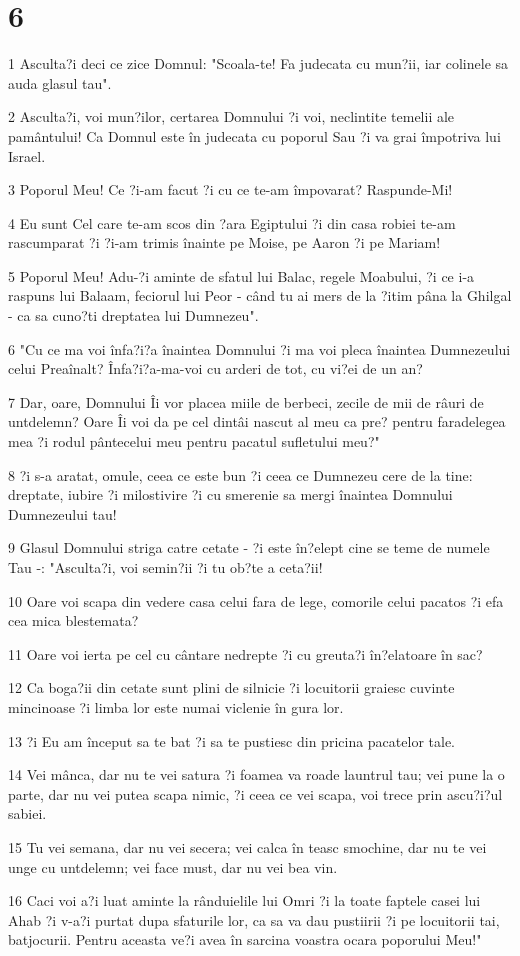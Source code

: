 \chapter{6}

\par 1 Asculta?i deci ce zice Domnul: "Scoala-te! Fa judecata cu mun?ii, iar colinele sa auda glasul tau".
\par 2 Asculta?i, voi mun?ilor, certarea Domnului ?i voi, neclintite temelii ale pamântului! Ca Domnul este în judecata cu poporul Sau ?i va grai împotriva lui Israel.
\par 3 Poporul Meu! Ce ?i-am facut ?i cu ce te-am împovarat? Raspunde-Mi!
\par 4 Eu sunt Cel care te-am scos din ?ara Egiptului ?i din casa robiei te-am rascumparat ?i ?i-am trimis înainte pe Moise, pe Aaron ?i pe Mariam!
\par 5 Poporul Meu! Adu-?i aminte de sfatul lui Balac, regele Moabului, ?i ce i-a raspuns lui Balaam, feciorul lui Peor - când tu ai mers de la ?itim pâna la Ghilgal - ca sa cuno?ti dreptatea lui Dumnezeu".
\par 6 "Cu ce ma voi înfa?i?a înaintea Domnului ?i ma voi pleca înaintea Dumnezeului celui Preaînalt? Înfa?i?a-ma-voi cu arderi de tot, cu vi?ei de un an?
\par 7 Dar, oare, Domnului Îi vor placea miile de berbeci, zecile de mii de râuri de untdelemn? Oare Îi voi da pe cel dintâi nascut al meu ca pre? pentru faradelegea mea ?i rodul pântecelui meu pentru pacatul sufletului meu?"
\par 8 ?i s-a aratat, omule, ceea ce este bun ?i ceea ce Dumnezeu cere de la tine: dreptate, iubire ?i milostivire ?i cu smerenie sa mergi înaintea Domnului Dumnezeului tau!
\par 9 Glasul Domnului striga catre cetate - ?i este în?elept cine se teme de numele Tau -: "Asculta?i, voi semin?ii ?i tu ob?te a ceta?ii!
\par 10 Oare voi scapa din vedere casa celui fara de lege, comorile celui pacatos ?i efa cea mica blestemata?
\par 11 Oare voi ierta pe cel cu cântare nedrepte ?i cu greuta?i în?elatoare în sac?
\par 12 Ca boga?ii din cetate sunt plini de silnicie ?i locuitorii graiesc cuvinte mincinoase ?i limba lor este numai viclenie în gura lor.
\par 13 ?i Eu am început sa te bat ?i sa te pustiesc din pricina pacatelor tale.
\par 14 Vei mânca, dar nu te vei satura ?i foamea va roade launtrul tau; vei pune la o parte, dar nu vei putea scapa nimic, ?i ceea ce vei scapa, voi trece prin ascu?i?ul sabiei.
\par 15 Tu vei semana, dar nu vei secera; vei calca în teasc smochine, dar nu te vei unge cu untdelemn; vei face must, dar nu vei bea vin.
\par 16 Caci voi a?i luat aminte la rânduielile lui Omri ?i la toate faptele casei lui Ahab ?i v-a?i purtat dupa sfaturile lor, ca sa va dau pustiirii ?i pe locuitorii tai, batjocurii. Pentru aceasta ve?i avea în sarcina voastra ocara poporului Meu!"

